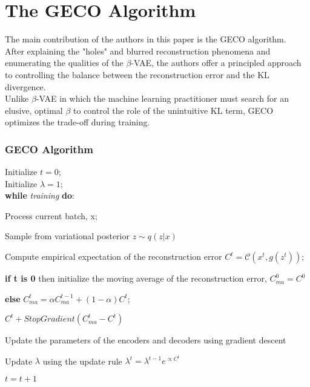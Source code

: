 \chapter*{The GECO Algorithm}
The main contribution of the authors in this paper is the GECO algorithm.\\
After explaining the "holes" and blurred reconstruction phenomena and enumerating the qualities of the $\beta$-VAE, the authors offer a principled approach to controlling the balance between the reconstruction error and the KL divergence.\\
Unlike $\beta$-VAE in which the machine learning practitioner must search for an elusive, optimal $\beta$ to control the role of the unintuitive KL term, GECO optimizes the trade-off during training.
\subsection*{GECO Algorithm}
Initialize $t = 0$;\\
Initialize $\lambda = 1$;\\
\textbf{while} \textit{training} \textbf{do}:
\renewenvironment{description}[1][0pt]
  {\list{}{\labelwidth=0pt \leftmargin=#1
   \let\makelabel\descriptionlabel}}
  {\endlist}
\begin{description}[1cm]
\item Process current batch, x;
\item Sample from variational posterior $z\sim{q(z|x)}$
\item Compute empirical expectation of the reconstruction error $C^t = \mathcal{C}(x^t,g(z^t))$;
\item \textbf{if t is 0} then initialize the moving average of the reconstruction error, $C_{ma}^0 = C^0$
\item \textbf{else} $C_{ma}^t = \alpha C_{ma}^{t-1} + (1-\alpha)C^t$;
\item $C^t + StopGradient(C_{ma}^t - C^t)$
\item Update the parameters of the encoders and decoders using gradient descent
\item Update $\lambda$ using the update rule $\lambda^t = \lambda^{t-1}e^{\propto C^t}$
\item $t = t+1$
\end{description}

